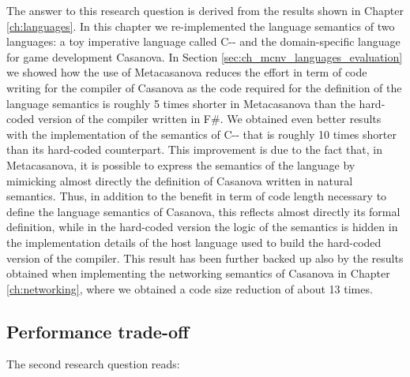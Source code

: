 The answer to this research question is derived from the results shown in Chapter \ref{ch:languages}. In this chapter we re-implemented the language semantics of two languages: a toy imperative language called C-{}- and the domain-specific language for game development Casanova. In Section \ref{sec:ch_mcnv_languages_evaluation} we showed how the use of Metacasanova reduces the effort in term of code writing for the compiler of Casanova as the code required for the definition of the language semantics is roughly 5 times shorter in Metacasanova than the hard-coded version of the compiler written in F\#. We obtained even better results with the implementation of the semantics of C-{}- that is roughly 10 times shorter than its hard-coded counterpart. This improvement is due to the fact that, in Metacasanova, it is possible to express the semantics of the language by mimicking almost directly the definition of Casanova written in natural semantics. Thus, in addition to the benefit in term of code length necessary to define the language semantics of Casanova, this reflects almost directly its formal definition, while in the hard-coded version the logic of the semantics is hidden in the implementation details of the host language used to build the hard-coded version of the compiler. This result has been further backed up also by the results obtained when implementing the networking semantics of Casanova in Chapter \ref{ch:networking}, where we obtained a code size reduction of about 13 times.

\subsection{Performance trade-off}
\label{subsec:ch_conclusion_rq2}
The second research question reads:\\\\
\\\\

